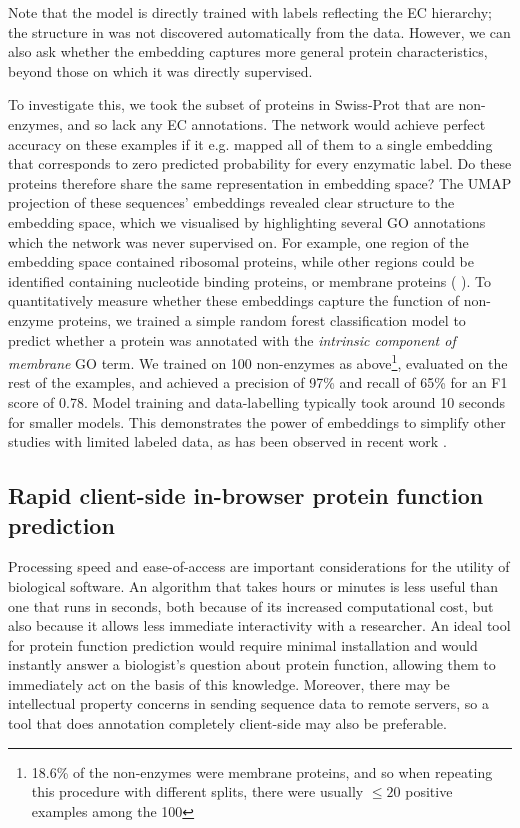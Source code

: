 Note that the model is directly trained with labels reflecting the EC hierarchy; the structure in  %
 was not discovered automatically from the data. However, we can also ask whether the embedding captures more general protein characteristics, beyond those on which it was directly supervised.

To investigate this, we took the subset of proteins in Swiss-Prot that are non-enzymes, and so lack any EC annotations. The network would achieve perfect accuracy on these examples if it e.g. mapped all of them to a single embedding that corresponds to zero predicted probability for every enzymatic label. Do these proteins therefore share the same representation in embedding space? The UMAP projection of these sequences' embeddings revealed clear structure to the embedding space, which we visualised by highlighting several GO annotations which the network was never supervised on. For example, one region of the embedding space contained ribosomal proteins, while other regions could be identified containing nucleotide binding proteins, or membrane proteins (%
).
To quantitatively measure whether these embeddings capture the function of non-enzyme proteins, we trained a simple random forest classification model to predict whether a protein was annotated with the \textit{intrinsic component of membrane} GO term. We trained on 100 non-enzymes as above\footnote{18.6\% of the non-enzymes were membrane proteins, and so when repeating this procedure with different splits, there were usually $\leq 20$ positive examples among the 100}, evaluated on the rest of the examples, and achieved a precision of 97\% and recall of 65\% for an F1 score of 0.78. Model training and data-labelling typically took around 10 seconds for smaller models. This demonstrates the power of embeddings to simplify other studies with limited labeled data, as has been observed in recent work \citep{Alley589333,biswas2020low}.

\subsection*{Rapid client-side in-browser protein function prediction}
Processing speed and ease-of-access are important considerations for the utility of biological software. An algorithm that takes hours or minutes is less useful than one that runs in seconds, both because of its increased computational cost, but also because it allows less immediate interactivity with a researcher. An ideal tool for protein function prediction would require minimal installation and would instantly answer a biologist's question about protein function, allowing them to immediately act on the basis of this knowledge. Moreover, there may be intellectual property concerns in sending sequence data to remote servers, so a tool that does annotation completely client-side may also be preferable.

